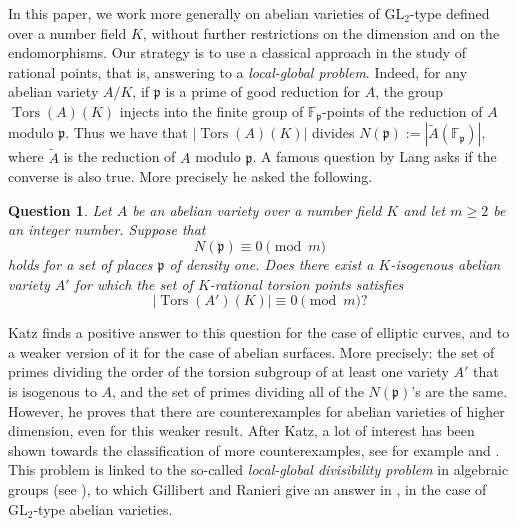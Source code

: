 \documentclass[a4paper,11pt]{amsart}
\newtheorem{question}[theorem]{Question}
\theoremstyle{definition}
\newcommand{\F}{\mathbb F}
\newcommand{\p}{\mathfrak{p}}
\newcommand{\GL}{\text{GL}}
\DeclareMathOperator{\Tors}{Tors}
\begin{document}
In this paper, we work more generally on abelian varieties of \(\GL_2\)-type defined over a number field \(K\), without further restrictions on the dimension and on the endomorphisms.
Our strategy is to use a classical approach in the study of rational points, that is, answering to a \emph{local-global problem}.
Indeed, for any abelian variety \(A/K\), if \(\p\) is a prime of good reduction for \(A\), the group \(\Tors(A)(K)\) injects into the finite group of \(\F_\p\)-points of the reduction of \(A\) modulo \(\p\). Thus we have that \(|\Tors(A)(K)|\) divides \(N(\p):=|\tilde{A}(\F_\p)|\), where \(\tilde{A}\) is the reduction of \(A\) modulo \(\p\).
A famous question by Lang asks if the converse is also true. More precisely he asked the following.
\begin{question}\label{question}
    Let \(A\) be an abelian variety over a number field \(K\) and let \(m\ge 2\) be an integer number. Suppose that 
    \[
    N(\p) \equiv 0 \pmod m
    \]
    holds for a set of places \(\p\) of density one. Does there exist a \(K\)-isogenous abelian variety \(A'\) for which the set of \(K\)-rational torsion points satisfies
    \[
    |\Tors(A')(K)| \equiv 0 \pmod m ?
    \]
\end{question}
Katz \cite{Katz1981GaloisVarieties} finds a positive answer to this question for the case of elliptic curves, and to a weaker version of it for the case of abelian surfaces. More precisely: the set of primes dividing the order of the torsion subgroup of at least one variety \(A'\) that is isogenous to \(A\), and the set of primes dividing all of the \(N(\p)\)'s are the same. However, he proves that there are counterexamples for abelian varieties of higher dimension, even for this weaker result.
After Katz, a lot of interest has been shown towards the classification of more counterexamples, see for example \cite{Cullinan2007LocalglobalVarieties, Cullinan2010PointsZarhin} and \cite{Cullinan2022DivisibilityFields}.
This problem is linked to the so-called \emph{local-global divisibility problem} in algebraic groups (see \cite[\S 8]{Dvornicich2022Local-globalGroups}), to which Gillibert and Ranieri give an answer in \cite{Gillibert2017OnVarieties, Gillibert2020OnVarieties}, in the case of \(\GL_2\)-type abelian varieties.
\end{document}
